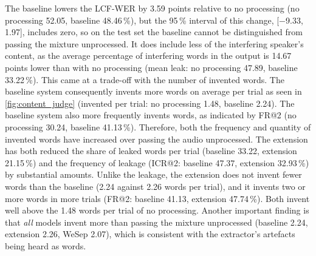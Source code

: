  The baseline lowers the LCF-WER by 3.59 points relative to no processing (no processing 52.05, baseline 48.46\,\%), but the 95\,\% interval of this change, [\num{-9.33}, \num[retain-explicit-plus]{+1.97}], includes zero, so on the test set the baseline cannot be distinguished from passing the mixture unprocessed. It does include less of the interfering speaker's content, as the average percentage of interfering words in the output is 14.67 points lower than with no processing (mean leak: no processing 47.89, baseline 33.22\,\%). This came at a trade-off with the number of invented words. The baseline system consequently invents more words on average per trial as seen in \autoref{fig:content_judge} (invented per trial: no processing 1.48, baseline 2.24). The baseline system also more frequently invents words, as indicated by FR@2 (no processing 30.24, baseline 41.13\,\%). Therefore, both the frequency and quantity of invented words have increased over passing the audio unprocessed. The extension has both reduced the share of leaked words per trial (baseline 33.22, extension 21.15\,\%) and the frequency of leakage (ICR@2: baseline 47.37, extension 32.93\,\%) by substantial amounts. Unlike the leakage, the extension does not invent fewer words than the baseline (2.24 against 2.26 words per trial), and it invents two or more words in more trials (FR@2: baseline 41.13, extension 47.74\,\%). Both invent well above the 1.48 words per trial of no processing. Another important finding is that \emph{all} models invent more than passing the mixture unprocessed (baseline 2.24, extension 2.26, WeSep 2.07), which is consistent with the extractor's artefacts being heard as words. 



